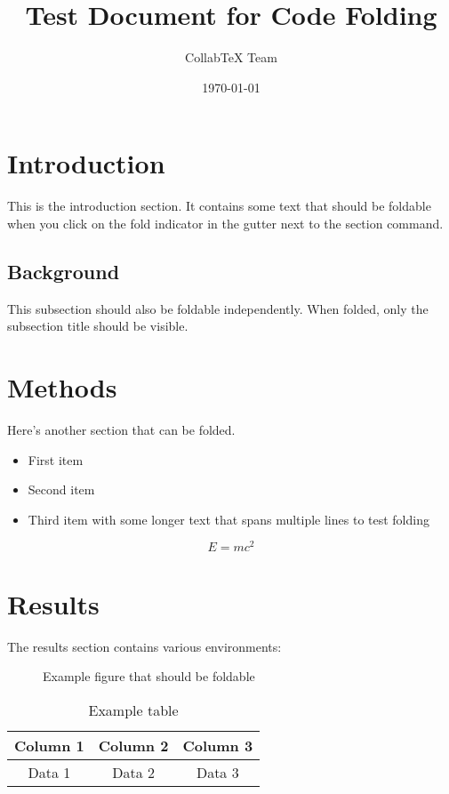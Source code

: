 \documentclass{article}
\title{Test Document for Code Folding}
\author{CollabTeX Team}
\date{\today}
\begin{document}
\maketitle

\section{Introduction}
This is the introduction section. It contains some text that should be foldable
when you click on the fold indicator in the gutter next to the section command.

\subsection{Background}
This subsection should also be foldable independently. When folded, only the
subsection title should be visible.

\section{Methods}
Here's another section that can be folded.

\begin{itemize}
    \item First item
    \item Second item
    \item Third item with some longer text that spans
          multiple lines to test folding
\end{itemize}

\begin{equation}
    E = mc^2
\end{equation}

\section{Results}
The results section contains various environments:

\begin{figure}[h]
    \centering
    \caption{Example figure that should be foldable}
    \label{fig:example}
\end{figure}

\begin{table}[h]
    \centering
    \begin{tabular}{|c|c|c|}
        \hline
        Column 1 & Column 2 & Column 3 \\
        \hline
        Data 1 & Data 2 & Data 3 \\
        \hline
    \end{tabular}
    \caption{Example table}
    \label{tab:example}
\end{table}
\end{document}
